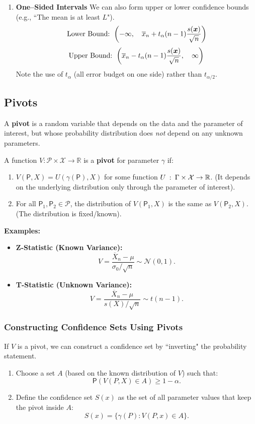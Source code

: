 \begin{ex}
\begin{enumerate}[label=\alph*)]
\item 
\textbf{One--Sided Intervals}
We can also form upper or lower confidence bounds (e.g., ``The mean is at least $L$").
\[
\text{Lower Bound: } \left(-\infty, \quad \overline{x}_n + t_{\alpha}(n-1)\frac{s(\boldsymbol{x})}{\sqrt{n}}\right)
\]
\[
\text{Upper Bound: } \left(\overline{x}_n - t_{\alpha}(n-1)\frac{s(\boldsymbol{x})}{\sqrt{n}}, \quad \infty\right)
\]
Note the use of $t_{\alpha}$ (all error budget on one side) rather than $t_{\alpha/2}$.
    \end{enumerate}
\end{ex}

\subsection{Pivots}

A \textbf{pivot} is a random variable that depends on the data and the parameter of interest, but whose probability distribution does \textit{not} depend on any unknown parameters.

\begin{definition}[Pivot]
A function $V: \mathcal{P} \times \mathcal{X} \to \mathbb{R}$ is a \textbf{pivot} for parameter $\gamma$ if:
\begin{enumerate}[label=\roman*)]
    \item $V(\mathsf{P}, X) = U(\gamma(\mathsf{P}), X)$ for some function $U \: : \: \Gamma \times \mathcal{X}\to \mathbb{R}$. (It depends on the underlying distribution only through the parameter of interest).
    \item For all $\mathsf{P}_1, \mathsf{P}_2 \in \mathcal{P}$, the distribution of $V(\mathsf{P}_1, X)$ is the same as $V(\mathsf{P}_2, X)$. (The distribution is fixed/known).
\end{enumerate}
\end{definition}

\textbf{Examples:}
\begin{itemize}
    \item \textbf{Z-Statistic (Known Variance):}
    \[ V = \frac{\overline{X}_n - \mu}{\sigma_0 / \sqrt{n}} \sim \mathcal{N}(0, 1). \]
    \item \textbf{T-Statistic (Unknown Variance):}
    \[ V = \frac{\overline{X}_n - \mu}{s(X)/\sqrt{n}} \sim t(n-1). \]
\end{itemize}

\subsubsection{Constructing Confidence Sets Using Pivots}
If $V$ is a pivot, we can construct a confidence set by ``inverting" the probability statement.
\begin{enumerate}
    \item Choose a set $A$ (based on the known distribution of $V$) such that:
    \[ \mathsf{P}(V(P, X) \in A) \ge 1 - \alpha. \]
    \item Define the confidence set $S(x)$ as the set of all parameter values that keep the pivot inside $A$:
    \[ S(x) = \{ \gamma(P) : V(P, x) \in A \}. \]
\end{enumerate}

